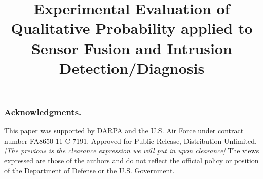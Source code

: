 \documentclass[letterpaper]{article}
\author{\ifthenelse{\boolean{anonymous}}{Anonymous}{Robert P. Goldman and John Maraist}}
\title{Experimental Evaluation of Qualitative Probability applied to Sensor Fusion and Intrusion Detection/Diagnosis}
\begin{document}
\maketitle









\subsubsection*{Acknowledgments.}
\label{sec:acknowledgments}
 
This paper was supported by DARPA and the U.S. Air Force under contract number
FA8650-11-C-7191.  
Approved for Public Release, Distribution Unlimited. 
\textit{[The previous is the clearance expression we will put in upon clearance]}
The views expressed are those of the
authors and do not reflect the official policy or position of the Department
of Defense or the U.S. Government.



\end{document}
